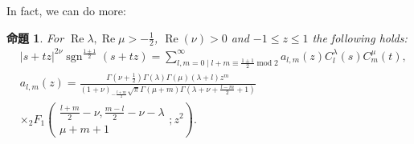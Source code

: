 \documentclass[pdf,notes]{beamer}
\newcommand{\tmop}[1]{\ensuremath{\operatorname{#1}}}
\newtheorem{prop}{命題}
\begin{document}
\begin{frame}
	In fact, we can do more:
	\begin{prop}\label{prop:exp-stz-gg}
		  \label{thm:4}For $\tmop{Re} \lambda, \tmop{Re} \mu > - \frac{1}{2}$,
		    $\tmop{Re} (\nu) > 0$ and $-1 \leqslant z \leqslant 1$ the following holds:
		      \begin{eqnarray}
			          & | s + t z |^{2 \nu} \tmop{sgn}^{\frac{1 \pm 1}{2}} (s + t z) = \sum_{l,
					      m = 0 \mid l + m \equiv \frac{1 \pm 1}{2} \tmop{mod} 2}^{\infty} a_{l, m}
					          (z) C_l^{\lambda} (s) C_m^{\mu} (t), &  \nonumber\\
						      & a_{l, m} (z) = \frac{\Gamma \left( \nu + \frac{1}{2} \right) \Gamma
						      (\lambda) \Gamma (\mu) (\lambda + l) z^m }{(1 + \nu)_{- \frac{l + m}{2}} \sqrt{\pi} \Gamma
										      (\mu + m) \Gamma \left( \lambda + \nu + \frac{l - m}{2} + 1 \right)}&\nonumber
										      \\&\times{}_2 F_1 \left( \begin{array}{c}
								        \frac{l + m}{2} - \nu, \frac{m - l}{2} - \nu - \lambda\\
									      \mu + m + 1
									          \end{array} ; z^2 \right). & 
										          \nonumber
											    \end{eqnarray}
										    \end{prop}
\end{frame}
\end{document}

